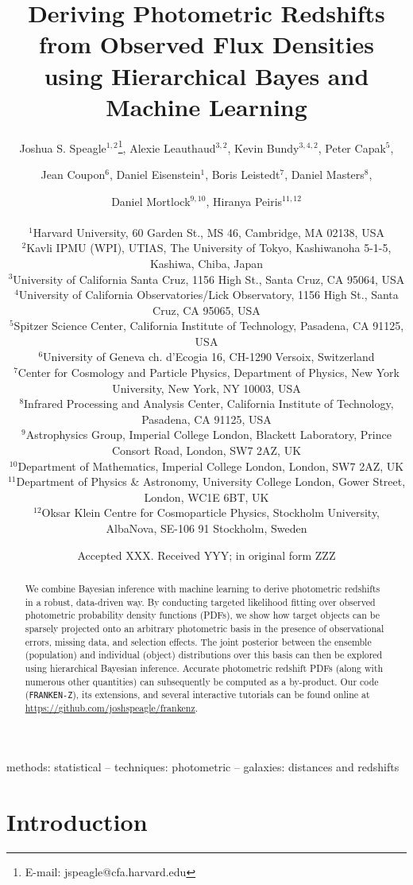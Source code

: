 \documentclass[a4paper,fleqn,usenatbib,english]{mnras}
\title[Photo-z's with Hierarchical Bayes and Machine Learning]{Deriving Photometric Redshifts from Observed Flux Densities using Hierarchical Bayes and Machine Learning}
\author[Speagle et al.]{
	Joshua S. Speagle$^{1,2}$\thanks{E-mail: jspeagle@cfa.harvard.edu},
	Alexie Leauthaud$^{3,2}$,
	Kevin Bundy$^{3,4,2}$, 
    Peter Capak$^{5}$, \and
    Jean Coupon$^{6}$,  
	Daniel Eisenstein$^{1}$,
    Boris Leistedt$^{7}$,
	Daniel Masters$^{8}$, \and
    Daniel Mortlock$^{9,10}$,
    Hiranya Peiris$^{11,12}$
	\\
    \\
	$^{1}$Harvard University, 60 Garden St., MS 46, Cambridge, MA 02138, USA\\
	$^{2}$Kavli IPMU (WPI), UTIAS, The University of Tokyo, Kashiwanoha 5-1-5, Kashiwa, Chiba, Japan\\
	$^{3}$University of California Santa Cruz, 1156 High St., Santa Cruz, CA 95064, USA\\
	$^{4}$University of California Observatories/Lick Observatory, 1156 High St., Santa Cruz, CA 95065, USA\\
 	$^{5}$Spitzer Science Center, California Institute of Technology, Pasadena, CA 91125, USA\\
 	$^{6}$University of Geneva ch. d'Ecogia 16, CH-1290 Versoix, Switzerland\\
 	$^{7}$Center for Cosmology and Particle Physics, Department of Physics, New York University, New York, NY 10003, USA\\
     $^{8}$Infrared Processing and Analysis Center, California Institute of Technology, Pasadena, CA 91125, USA\\
     $^{9}$Astrophysics Group, Imperial College London, Blackett Laboratory, Prince Consort Road, London, SW7 2AZ, UK\\
     $^{10}$Department of Mathematics, Imperial College London, London, SW7 2AZ, UK\\
     $^{11}$Department of Physics \& Astronomy, University College London, Gower Street, London, WC1E 6BT, UK\\
     $^{12}$Oksar Klein Centre for Cosmoparticle Physics, Stockholm University, AlbaNova, SE-106 91 Stockholm, Sweden
}
\date{Accepted XXX. Received YYY; in original form ZZZ}
\begin{document}
\label{firstpage}
\pagerange{\pageref{firstpage}--\pageref{lastpage}}
\maketitle
	
\begin{abstract}
We combine Bayesian inference with machine learning to derive photometric redshifts in a robust, data-driven way. By conducting targeted likelihood fitting over observed photometric probability density functions (PDFs), we show how target objects can be sparsely projected onto an arbitrary photometric basis in the presence of observational errors, missing data, and selection effects. The joint posterior between the ensemble (population) and individual (object) distributions over this basis can then be explored using hierarchical Bayesian inference. Accurate photometric redshift PDFs (along with numerous other quantities) can subsequently be computed as a by-product. Our code (\texttt{FRANKEN-Z}), its extensions, and several interactive tutorials can be found online at \url{https://github.com/joshspeagle/frankenz}.
\end{abstract}

\begin{keywords}
methods: statistical -- techniques: photometric -- galaxies: distances and redshifts
\end{keywords}



\section{Introduction}
\label{sec:intro}
\end{document}
